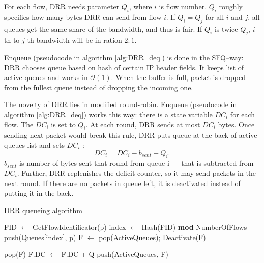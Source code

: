 For each flow, DRR needs parameter $Q_i$, where $i$ is flow number. $Q_i$ roughly specifies how many bytes DRR can send from flow $i$. If $Q_i = Q_j$ for all $i$ and $j$, all queues get the same share of the bandwidth, and thus is fair. If $Q_i$ is twice $Q_j$, $i$-th to $j$-th bandwidth will be in ration $2:1$.

Enqueue (pseudocode in algorithm \autoref{alg:DRR_deq}) is done in the SFQ--way: DRR chooses queue based on hash of certain IP header fields. It keeps list of active queues and works in $\mathcal{O}(1)$. When the buffer is full, packet is dropped from the fullest queue instead of dropping the incoming one.

The novelty of DRR lies in modified round-robin. Enqueue (pseudocode in algorithm \autoref{alg:DRR_deq}) works this way: there is a state variable $DC_i$ for each flow. The $DC_i$ is set to $Q_i$. At each round, DRR sends at most $DC_i$ bytes. Once sending next packet would break this rule, DRR puts queue  at the back of active queues list and sets $DC_i$ :
\[
  DC_i = DC_i - b_{sent} + Q_i.
\]
$b_{sent}$ is number of bytes sent that round from queue i --- that is subtracted from $DC_i$. Further, DRR replenishes the deficit counter, so it may send packets in the next round. If there are no packets in queue left, it is deactivated instead of putting it in the back.

\begin{algorithm}[t]
	\caption{DRR queueing algorithm}
	\label{alg:DRR_deq}
	\begin{algorithmic}
		\State FID $\leftarrow$ GetFlowIdentificator(p)
		\State index $\leftarrow$ Hash(FID) \textbf{mod} NumberOfFlows
		\State push(Queues[index], p)
		\State \Return
	\EndFunction
			\State F $\leftarrow$ pop(ActiveQueues);
				\State Deactivate(F)
				
					\State \Return pop(F)
			\Else {}
				\State F.DC $\leftarrow$ F.DC + Q
				\State push(ActiveQueues, F)
			\EndIf
		\EndWhile
	\EndFunction
	\end{algorithmic}
\end{algorithm}

